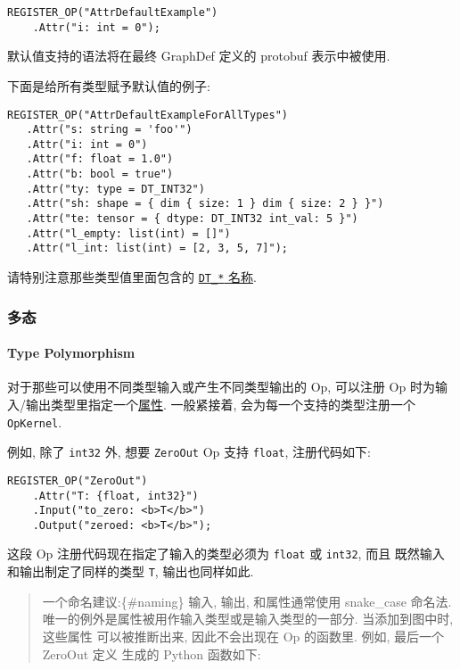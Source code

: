 \begin{verbatim}
REGISTER_OP("AttrDefaultExample")
    .Attr("i: int = 0");
\end{verbatim}

默认值支持的语法将在最终 GraphDef 定义的 protobuf 表示中被使用.

下面是给所有类型赋予默认值的例子:

\begin{verbatim}
REGISTER_OP("AttrDefaultExampleForAllTypes")
   .Attr("s: string = 'foo'")
   .Attr("i: int = 0")
   .Attr("f: float = 1.0")
   .Attr("b: bool = true")
   .Attr("ty: type = DT_INT32")
   .Attr("sh: shape = { dim { size: 1 } dim { size: 2 } }")
   .Attr("te: tensor = { dtype: DT_INT32 int_val: 5 }")
   .Attr("l_empty: list(int) = []")
   .Attr("l_int: list(int) = [2, 3, 5, 7]");
\end{verbatim}

请特别注意那些类型值里面包含的
\href{tensorflow-zh/SOURCE/resources/dims_types.md\#data-types}{\texttt{DT\_*}
名称}.

\subsubsection{多态 }\label{ux591aux6001}

\hypertarget{type-polymorphism}{\paragraph{Type Polymorphism
}\label{type-polymorphism}}

对于那些可以使用不同类型输入或产生不同类型输出的 Op, 可以注册 Op
时为输入/输出类型里指定一个\protect\hyperlink{attrs}{属性}. 一般紧接着,
会为每一个支持的类型注册一个 \texttt{OpKernel}.

例如, 除了 \texttt{int32} 外, 想要 \texttt{ZeroOut} Op 支持
\texttt{float}, 注册代码如下:

\begin{verbatim}
REGISTER_OP("ZeroOut")
    .Attr("T: {float, int32}")
    .Input("to_zero: <b>T</b>")
    .Output("zeroed: <b>T</b>");
\end{verbatim}

这段 Op 注册代码现在指定了输入的类型必须为 \texttt{float} 或
\texttt{int32}, 而且 既然输入和输出制定了同样的类型 \texttt{T},
输出也同样如此.

\begin{quote}
一个命名建议:\{\#naming\} 输入, 输出, 和属性通常使用 snake\_case 命名法.
唯一的例外是属性被用作输入类型或是输入类型的一部分. 当添加到图中时,
这些属性 可以被推断出来, 因此不会出现在 Op 的函数里. 例如, 最后一个
ZeroOut 定义 生成的 Python 函数如下:
\end{quote}

